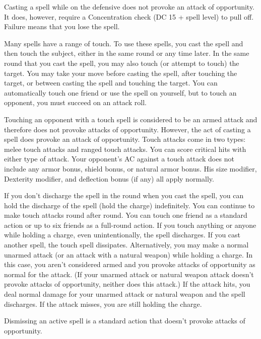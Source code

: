 Casting a spell while on the defensive does not provoke an attack of opportunity. It does, however, require a Concentration check (DC 15 + spell level) to pull off. Failure means that you lose the spell.
	
Many spells have a range of touch. To use these spells, you cast the spell and then touch the subject, either in the same round or any time later. In the same round that you cast the spell, you may also touch (or attempt to touch) the target. You may take your move before casting the spell, after touching the target, or between casting the spell and touching the target. You can automatically touch one friend or use the spell on yourself, but to touch an opponent, you must succeed on an attack roll.
	
Touching an opponent with a touch spell is considered to be an armed attack and therefore does not provoke attacks of opportunity. However, the act of casting a spell does provoke an attack of opportunity. Touch attacks come in two types: melee touch attacks and ranged touch attacks. You can score critical hits with either type of attack. Your opponent's AC against a touch attack does not include any armor bonus, shield bonus, or natural armor bonus. His size modifier, Dexterity modifier, and deflection bonus (if any) all apply normally.
	
If you don't discharge the spell in the round when you cast the spell, you can hold the discharge of the spell (hold the charge) indefinitely. You can continue to make touch attacks round after round. You can touch one friend as a standard action or up to six friends as a full-round action. If you touch anything or anyone while holding a charge, even unintentionally, the spell discharges. If you cast another spell, the touch spell dissipates. Alternatively, you may make a normal unarmed attack (or an attack with a natural weapon) while holding a charge. In this case, you aren't considered armed and you provoke attacks of opportunity as normal for the attack. (If your unarmed attack or natural weapon attack doesn't provoke attacks of opportunity, neither does this attack.) If the attack hits, you deal normal damage for your unarmed attack or natural weapon and the spell discharges. If the attack misses, you are still holding the charge.

Dismissing an active spell is a standard action that doesn't provoke attacks of opportunity.

